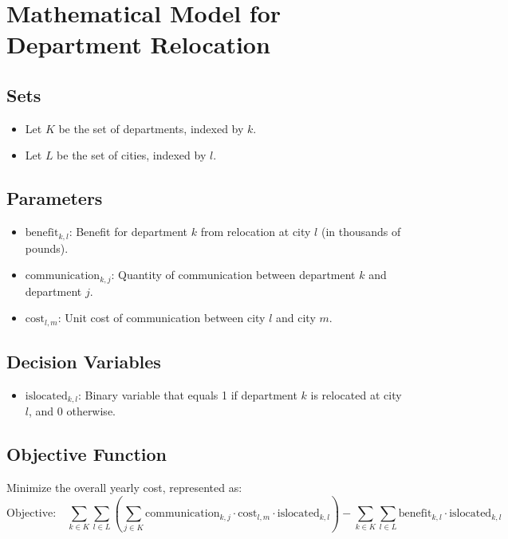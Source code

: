 \documentclass{article}
\begin{document}
\section*{Mathematical Model for Department Relocation}

\subsection*{Sets}
\begin{itemize}
    \item Let \( K \) be the set of departments, indexed by \( k \).
    \item Let \( L \) be the set of cities, indexed by \( l \).
\end{itemize}

\subsection*{Parameters}
\begin{itemize}
    \item \( \text{benefit}_{k,l} \): Benefit for department \( k \) from relocation at city \( l \) (in thousands of pounds).
    \item \( \text{communication}_{k,j} \): Quantity of communication between department \( k \) and department \( j \).
    \item \( \text{cost}_{l,m} \): Unit cost of communication between city \( l \) and city \( m \).
\end{itemize}

\subsection*{Decision Variables}
\begin{itemize}
    \item \( \text{islocated}_{k,l} \): Binary variable that equals 1 if department \( k \) is relocated at city \( l \), and 0 otherwise.
\end{itemize}

\subsection*{Objective Function}
Minimize the overall yearly cost, represented as:
\[
\text{Objective:} \quad \sum_{k \in K} \sum_{l \in L} \left( \sum_{j \in K} \text{communication}_{k,j} \cdot \text{cost}_{l,m} \cdot \text{islocated}_{k,l} \right) - \sum_{k \in K} \sum_{l \in L} \text{benefit}_{k,l} \cdot \text{islocated}_{k,l}
\]
\end{document}
